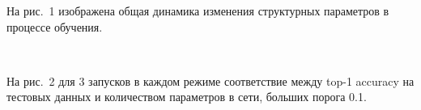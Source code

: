 \documentclass[12pt,twoside]{article}
\begin{document}
На рис.~1 изображена общая динамика изменения структурных параметров в процессе обучения.
\begin{figure}[!htbp]
	\centering
	\\
	\caption{}
	\label{}
\end{figure}

На рис.~2 для 3 запусков в каждом режиме соответствие между top-1 accuracy на тестовых данных и количеством параметров в сети, больших порога 0.1.
\end{document}
